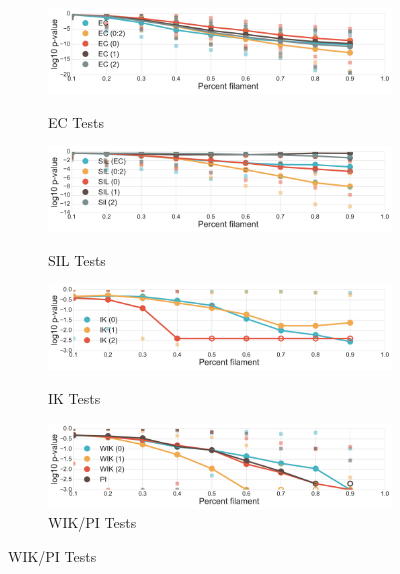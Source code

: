 \documentclass[12pt]{article}
\begin{document}
\begin{description}
  \begin{center}
    \begin{figure}[htp!]
      \centering
      \begin{subfigure}{.5\textwidth}
        \centering
        \caption{EC Tests}
        \includegraphics[width=\linewidth]{figure_8_all_euler_group_normed.pdf}
        \label{fig:all_euler}
      \end{subfigure}
      \begin{subfigure}{.5\textwidth}
        \centering
        \caption{SIL Tests}
        \includegraphics[width=\linewidth]{figure_8_all_silhouette_group_normed.pdf}
        \label{fig:all_silh}
      \end{subfigure}
      \begin{subfigure}{.5\textwidth}
        \centering
        \caption{IK Tests}
        \includegraphics[width=\linewidth]{figure_8_all_contour_group_normed.pdf}
        \label{fig:all_contour}
      \end{subfigure}
      \begin{subfigure}{.5\textwidth}
        \centering
        \caption{WIK/PI Tests}
        \includegraphics[width=\linewidth]{figure_8_all_weighted_contour_group_normed.pdf}

\end{subfigure}
\end{figure}
\end{center}
\end{description}
\end{document}
